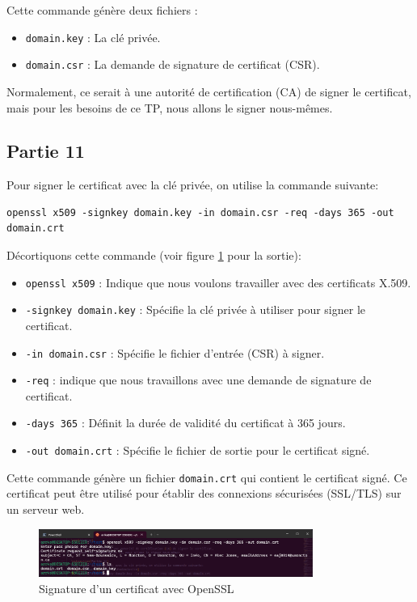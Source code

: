 \documentclass[12pt,a4paper]{article}
\begin{document}
Cette commande génère deux fichiers :
\begin{itemize}
    \item \texttt{domain.key} : La clé privée.
    \item \texttt{domain.csr} : La demande de signature de certificat (CSR).
\end{itemize}

Normalement, ce serait à une autorité de certification (CA) de signer le certificat,
mais pour les besoins de ce TP, nous allons le signer nous-mêmes.

\subsection{Partie 11}
Pour signer le certificat avec la clé privée, on utilise la commande suivante:
\begin{Verbatim}[fontsize=\footnotesize]
    openssl x509 -signkey domain.key -in domain.csr -req -days 365 -out domain.crt
\end{Verbatim}

Décortiquons cette commande (voir figure \ref{opensslCertSign} pour la sortie):
\begin{itemize}
    \item \texttt{openssl x509} : Indique que nous voulons travailler avec des certificats X.509.
    \item \texttt{-signkey domain.key} : Spécifie la clé privée à utiliser pour signer le certificat.
    \item \texttt{-in domain.csr} : Spécifie le fichier d'entrée (CSR) à signer.
    \item \texttt{-req} : indique que nous travaillons avec une demande de signature de certificat.
    \item \texttt{-days 365} : Définit la durée de validité du certificat à 365 jours.
    \item \texttt{-out domain.crt} : Spécifie le fichier de sortie pour le certificat signé.
\end{itemize}

Cette commande génère un fichier \texttt{domain.crt} qui contient le certificat signé.
Ce certificat peut être utilisé pour établir des connexions sécurisées (SSL/TLS) sur un serveur web.

\begin{figure}[ht]
    \centering
    \includegraphics[width=0.8\textwidth]{../img/opensslCertSign.png}
    \caption{Signature d'un certificat avec OpenSSL}
    \label{opensslCertSign}
\end{figure}
\end{document}
